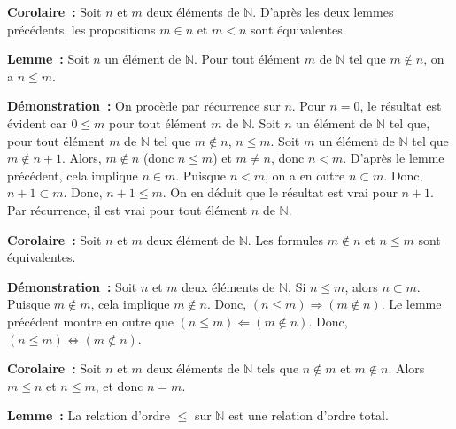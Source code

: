    \done 

\medskip

\noindent\textbf{Corolaire :} 
    Soit $n$ et $m$ deux éléments de $\mathbb{N}$. 
    D'après les deux lemmes précédents, les propositions $m \in n$ et $m < n$ sont équivalentes.

\medskip

\noindent\textbf{Lemme :} 
    Soit $n$ un élément de $\mathbb{N}$. 
    Pour tout élément $m$ de $\mathbb{N}$ tel que $m \notin n$, on a $n \leq m$.

\medskip

\noindent\textbf{Démonstration :} 
    On procède par récurrence sur $n$. 
    Pour $n=0$, le résultat est évident car $0 \leq m$ pour tout élément $m$ de $\mathbb{N}$.
    Soit $n$ un élément de $\mathbb{N}$ tel que, pour tout élément $m$ de $\mathbb{N}$ tel que $m \notin n$, $n \leq m$. 
    Soit $m$ un élément de $\mathbb{N}$ tel que $m \notin n+1$. 
    Alors, $m \notin n$ (donc $n \leq m$) et $m \neq n$, donc $n < m$. 
    D'après le lemme précédent, cela implique $n \in m$. 
    Puisque $n < m$, on a en outre $n \subset m$. 
    Donc, $n+1 \subset m$. 
    Donc, $n+1 \leq m$. 
    On en déduit que le résultat est vrai pour $n+1$.
    Par récurrence, il est vrai pour tout élément $n$ de $\mathbb{N}$. 

   \done 

\medskip

\noindent\textbf{Corolaire :} 
    Soit $n$ et $m$ deux élément de $\mathbb{N}$. 
    Les formules $m \notin n$ et $n \leq m$ sont équivalentes.

\medskip

\noindent\textbf{Démonstration :} 
    Soit $n$ et $m$ deux éléments de $\mathbb{N}$. 
    Si $n \leq m$, alors $n \subset m$. 
    Puisque $m \notin m$, cela implique $m \notin n$. 
    Donc, $(n \leq m) \Rightarrow (m \notin n)$.
    Le lemme précédent montre en outre que $(n \leq m) \Leftarrow (m \notin n)$.
    Donc, $(n \leq m) \Leftrightarrow (m \notin n)$.
    
   \done 

\medskip

\noindent\textbf{Corolaire :} Soit $n$ et $m$ deux éléments de $\mathbb{N}$ tels que $n \notin m$ et $m \notin n$. 
    Alors $m \leq n$ et $n \leq m$, et donc $n = m$.

\medskip

\noindent\textbf{Lemme :} La relation d'ordre $\leq$ sur $\mathbb{N}$ est une relation d'ordre total.

